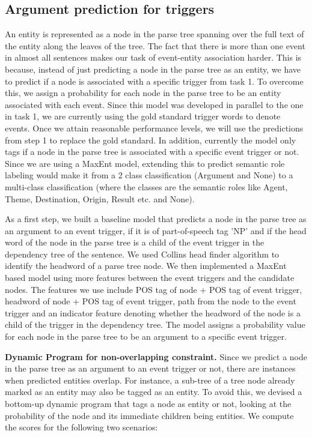 \subsection{Argument prediction for triggers}
An entity is represented as a node in the parse tree spanning over the full text of the entity along the leaves of the tree. The fact that there is more than one event in almost all sentences makes our task of event-entity association harder. This is because, instead of just predicting a node in the parse tree as an entity, we have to predict if a node is associated with a specific trigger from task 1. To overcome this, we assign a probability for each node in the parse tree to be an entity associated with each event. Since this model was developed in parallel to the one in task 1, we are currently using the gold standard trigger words to denote events. Once we attain reasonable performance levels, we will use the predictions from step 1 to replace the gold standard. In addition, currently the model only tags if a node in the parse tree is associated with a specific event trigger or not. Since we are using a MaxEnt model, extending this to predict semantic role labeling would make it from a 2 class classification (Argument and None) to a multi-class classification (where the classes are the semantic roles like Agent, Theme, Destination, Origin, Result etc. and None).

As a first step, we built a baseline model that predicts a node in the parse tree as an argument to an event trigger, if it is of part-of-speech tag 'NP' and if the head word of the node in the parse tree is a child of the event trigger in the dependency tree of the sentence. We used Collins head finder algorithm to identify the headword of a parse tree node. We then implemented a MaxEnt based model using more features between the event triggers and the candidate nodes. The features we use include POS tag of node + POS tag of event trigger, headword of node + POS tag of event trigger, path from the node to the event trigger and an indicator feature denoting whether the headword of the node is a child of the trigger in the dependency tree. The model assigns a probability value for each node in the parse tree to be an argument to a specific event trigger.

{\bf Dynamic Program for non-overlapping constraint.} Since we predict a node in the parse tree as an argument to an event trigger or not, there are instances when predicted entities overlap. For instance, a sub-tree of a tree node already marked as an entity may also be tagged as an entity. To avoid this, we devised a bottom-up dynamic program that tags a node as entity or not, looking at the probability of the node and its immediate children being entities. We compute the scores for the following two scenarios:


